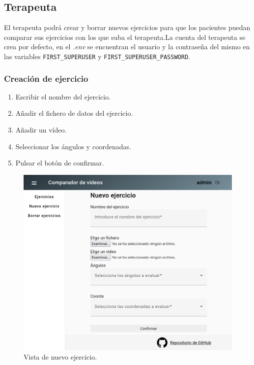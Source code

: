 \subsection{Terapeuta}
El terapeuta podrá crear y borrar nuevos ejercicios para que los pacientes puedan comparar sus ejercicios con los que suba el terapeuta.La cuenta del terapeuta se crea por defecto, en el \textit{.env} se encuentran el usuario y la contraseña del mismo en las variables \texttt{FIRST\_SUPERUSER} y \texttt{FIRST\_SUPERUSER\_PASSWORD}.
\subsubsection{Creación de ejercicio}
\begin{enumerate}
	\item Escribir el nombre del ejercicio.
	\item Añadir el fichero de datos del ejercicio.
	\item Añadir un vídeo.
	\item Seleccionar los ángulos y coordenadas.
	\item Pulsar el botón de confirmar.
\end{enumerate}

\begin{figure}
	\centering
	\includegraphics[width=0.7\linewidth]{img/ManualDeUsuario/nuevoEjercicio}
	\caption{Vista de nuevo ejercicio.}
	\label{fig:nuevoejercicio}
\end{figure}


